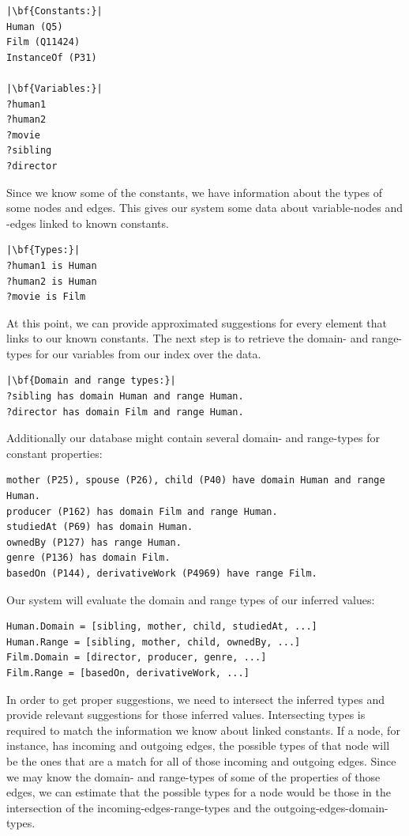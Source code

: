 \begin{verbatim}
|\bf{Constants:}|
Human (Q5)
Film (Q11424)
InstanceOf (P31)

|\bf{Variables:}|
?human1
?human2
?movie
?sibling
?director
\end{verbatim}

Since we know some of the constants, we have information about the types of some nodes and edges. This gives our system some data about variable-nodes and -edges linked to known constants. 

\begin{verbatim}
|\bf{Types:}|
?human1 is Human
?human2 is Human
?movie is Film
\end{verbatim}

At this point, we can provide approximated suggestions for every element that links to our known constants. The next step is to retrieve the domain- and range-types for our variables from our index over the data. 

\begin{verbatim}
|\bf{Domain and range types:}|
?sibling has domain Human and range Human.
?director has domain Film and range Human.
\end{verbatim}

Additionally our database might contain several domain- and range-types for constant properties:

\begin{verbatim}
mother (P25), spouse (P26), child (P40) have domain Human and range Human.
producer (P162) has domain Film and range Human.
studiedAt (P69) has domain Human.
ownedBy (P127) has range Human.
genre (P136) has domain Film.
basedOn (P144), derivativeWork (P4969) have range Film.
\end{verbatim}

Our system will evaluate the domain and range types of our inferred values:
\begin{verbatim}
Human.Domain = [sibling, mother, child, studiedAt, ...]
Human.Range = [sibling, mother, child, ownedBy, ...]
Film.Domain = [director, producer, genre, ...]
Film.Range = [basedOn, derivativeWork, ...]
\end{verbatim}

In order to get proper suggestions, we need to intersect the inferred types and provide relevant suggestions for those inferred values. Intersecting types is required to match the information we know about linked constants. If a node, for instance, has incoming and outgoing edges, the possible types of that node will be the ones that are a match for all of those incoming and outgoing edges. Since we may know the domain- and range-types of some of the properties of those edges, we can estimate that the possible types for a node would be those in the intersection of the incoming-edges-range-types and the outgoing-edges-domain-types.

